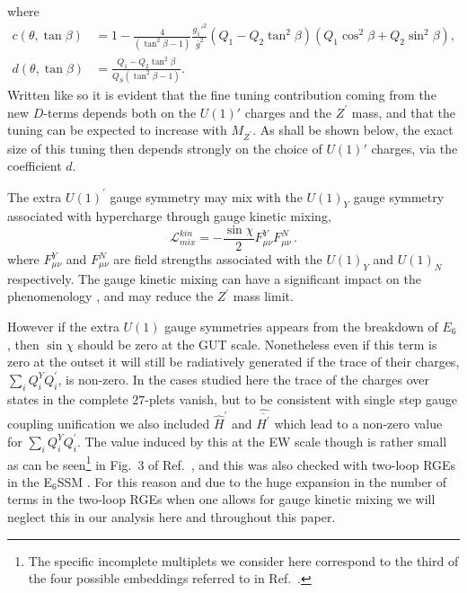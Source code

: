 \documentclass[preprint,amsmath,amssymb,aps,superscriptaddress,prd,
showpacs,floatfix,nofootinbib]{revtex4-1}
\newcommand{\be}{\begin{equation}}
\newcommand{\ee}{\end{equation}}
\begin{document}
where
\begin{align}
c(\theta , \tan\beta) &= 1 - \frac{4}{\left (\tan^2\beta - 1 \right )}
\frac{g_1'^2}{\bar{g}^2} \left (Q_1 - Q_2 \tan^2\beta \right )
\left (Q_1 \cos^2\beta + Q_2 \sin^2\beta \right ) , \label{eq:cdefn} \\
d(\theta , \tan\beta) &= \frac{Q_1 - Q_2 \tan^2\beta}
{Q_S \left (\tan^2\beta - 1\right )} . \label{eq:ddefn}
\end{align}
Written like so it is evident that the fine tuning contribution coming
from the new $D$-terms depends both on the $U(1)'$ charges and the
$Z^\prime$ mass, and that the tuning can be expected to increase with
$M_{Z^\prime}$.  As shall be shown below, the exact size of this tuning
then depends strongly on the choice of $U(1)'$ charges, via the
coefficient $d$.

The extra $U(1)^\prime$ gauge symmetry may mix with the $U(1)_Y$ gauge
symmetry associated with hypercharge through gauge kinetic mixing,
\be
\mathcal{L}_{mix}^{kin}=-\frac{\sin\chi}{2}F^{Y}_{\mu\nu}F^{N}_{\mu\nu}\,.
\label{Eq:GKM}
\ee where $F_{\mu\nu}^Y$ and $F_{\mu\nu}^{N}$ are field strengths
associated with the $U(1)_Y$ and $U(1)_{N}$ respectively.  The gauge
kinetic mixing can have a significant impact on the phenomenology
\cite{Rizzo:1998ut,Salvioni:2009mt,Krauss:2012ku}, and may reduce the
$Z^\prime$ mass limit.

However if the extra $U(1)$ gauge symmetries appears from the
breakdown of $E_6$, then $\sin\chi$ should be zero at the GUT scale.
Nonetheless even if this term is zero at the outset it will still be
radiatively generated if the trace of their charges, $\sum_i Q_i^Y
Q^\prime_i$, is non-zero.  In the cases studied here the trace of the
charges over states in the complete $27$-plets vanish, but to be
consistent with single step gauge coupling unification we also
included $\hat{H}^\prime$ and $\hat{\overline{H^\prime}}$ which lead
to a non-zero value for $\sum_i Q_i^Y Q^\prime_i $.  The value induced
by this at the EW scale though is rather small as can be
seen\footnote{The specific incomplete multiplets we consider here
  correspond to the third of the four possible embeddings referred to in
  Ref.~\cite{Rizzo:1998ut}.} in Fig.~3 of Ref.~\cite{Rizzo:1998ut}, and this
was also checked
with two-loop RGEs in the E$_6$SSM \cite{King:2005jy,Athron:2009bs}.
For this reason and due to the huge expansion in the number of terms
in the two-loop RGEs when one allows for gauge kinetic mixing we will
neglect this in our analysis here and throughout this paper.
\end{document}
